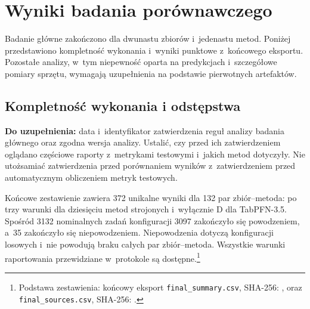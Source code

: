 \clearpage
\section{Wyniki badania porównawczego}
\label{chap:wyniki}

Badanie główne zakończono dla dwunastu zbiorów i~jedenastu metod. Poniżej przedstawiono kompletność wykonania i~wyniki punktowe z~końcowego eksportu. Pozostałe analizy, w~tym niepewność oparta na predykcjach i~szczegółowe pomiary sprzętu, wymagają uzupełnienia na podstawie pierwotnych artefaktów.

\subsection{Kompletność wykonania i odstępstwa}
\label{sec:wyniki-kompletnosc}


\textbf{Do uzupełnienia:} data i~identyfikator zatwierdzenia reguł analizy badania głównego oraz zgodna wersja analizy. Ustalić, czy przed ich zatwierdzeniem oglądano częściowe raporty z~metrykami testowymi i~jakich metod dotyczyły. Nie utożsamiać zatwierdzenia przed porównaniem wyników z~zatwierdzeniem przed automatycznym obliczeniem metryk testowych.

Końcowe zestawienie zawiera 372 unikalne wyniki dla 132 par zbiór--metoda: po trzy warunki dla dziesięciu metod strojonych i~wyłącznie D dla TabPFN-3.5. Spośród 3132 nominalnych zadań konfiguracji 3097 zakończyło się powodzeniem, a~35 zakończyło się niepowodzeniem. Niepowodzenia dotyczą konfiguracji losowych i~nie powodują braku całych par zbiór--metoda. Wszystkie warunki raportowania przewidziane w~protokole są dostępne.\footnote{Podstawa zestawienia: końcowy eksport \texttt{final\_summary.csv}, SHA-256: , oraz \texttt{final\_sources.csv}, SHA-256: .}

